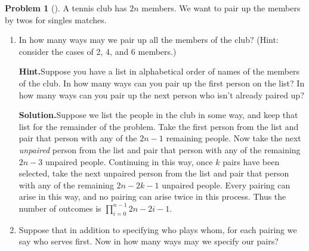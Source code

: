 \documentclass[10pt,]{book}
\theoremstyle{plain}
\theoremstyle{definition}
\newtheorem{activity}[project]{Problem}
\theoremstyle{definition}
\numberwithin{equation}{chapter}
\begin{document}
\begin{activity}[]\label{tennispairings1}
A tennis club has \(2n\) members. We want to pair up the members by twos for singles matches.%
\begin{enumerate}[font=\bfseries,label=(\alph*),ref=\alph*]
\item\label{tennispairings1a} In how many ways may we pair up all the members of the club? (Hint: consider the cases of 2, 4, and 6 members.)%
\par\medskip\noindent%
\textbf{Hint.}\quad Suppose you have a list in alphabetical order of names of the members of the club. In how many ways can you pair up the first person on the list? In how many ways can you pair up the next person who isn't already paired up?%
\par\medskip\noindent%
\textbf{Solution.}\quad Suppose we list the people in the club in some way, and keep that list for the remainder of the problem. Take the first person from the list and pair that person with any of the \(2n-1\) remaining people. Now take the next \emph{unpaired} person from the list and pair that person with any of the remaining \(2n-3\) unpaired people. Continuing in this way, once \(k\) pairs have been selected, take the next unpaired person from the list and pair that person with any of the remaining \(2n-2k-1\) unpaired people. Every pairing can arise in this way, and no pairing can arise twice in this process. Thus the number of outcomes is \(\prod_{i=0}^{n-1} 2n-2i-1\).%
\item\label{task-14} Suppose that in addition to specifying who plays whom, for each pairing we say who serves first.  Now in how many ways may we specify our pairs?%
\end{enumerate}
\end{activity}
\end{document}
